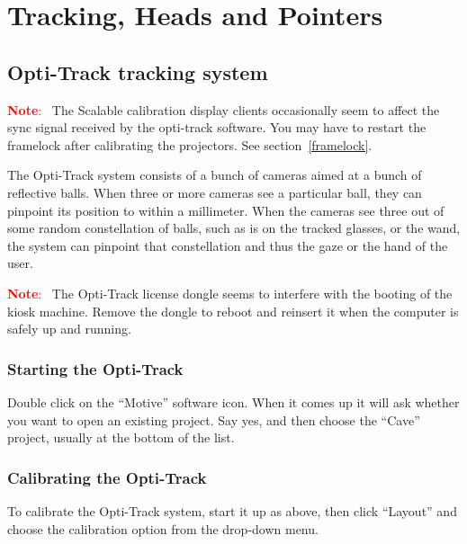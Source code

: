 \documentclass[11pt]{article}
\newenvironment{note}[1][Note]{\begin{lrbox}{\notebox}%
    \begin{minipage}{0.9\columnwidth}\textcolor{red}{\textbf{#1}:~}}%
    {\end{minipage}\end{lrbox}\begin{center}\setlength{\fboxsep}{8pt}%
    \fbox{\usebox{\notebox}}\end{center}}
\begin{document}
\section{Tracking, Heads and Pointers}

\subsection{Opti-Track tracking system}
\label{opti-track}

\begin{note}
  The Scalable calibration display clients occasionally seem to affect
  the sync signal received by the opti-track software.  You may have
  to restart the framelock after calibrating the projectors.  See
  section~\ref{framelock}.
\end{note}

The Opti-Track system consists of a bunch of cameras aimed at a bunch
of reflective balls.  When three or more cameras see a particular
ball, they can pinpoint its position to within a millimeter.  When the
cameras see three out of some random constellation of balls, such as
is on the tracked glasses, or the wand, the system can pinpoint that
constellation and thus the gaze or the hand of the user.


\begin{note}
  The Opti-Track license dongle seems to interfere with the booting of
  the kiosk machine.  Remove the dongle to reboot and reinsert it when
  the computer is safely up and running.
\end{note}

\subsubsection{Starting the Opti-Track}

Double click on the ``Motive'' software icon.  When it comes up it
will ask whether you want to open an existing project.  Say yes, and
then choose the ``Cave'' project, usually at the bottom of the list.

\subsubsection{Calibrating the Opti-Track}

To calibrate the Opti-Track system, start it up as above, then click
``Layout'' and choose the calibration option from the drop-down menu.
\end{document}
